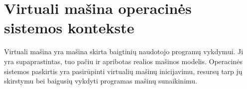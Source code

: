 \section{Virtuali mašina operacinės sistemos kontekste}

Virtuali mašina yra mašina skirta baigtinių naudotojo programų vykdymui. Ji
yra supaprastintas, tuo pačiu ir apribotas realios mašinos modelis. 
Operacinės sistemos paskirtis yra pasirūpinti virtualių mašinų inicijavimu,
resursų tarp jų skirstymu bei baigusių vykdyti programas mašinų 
sunaikinimu.
